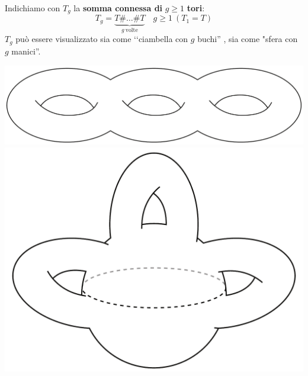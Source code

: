 \begin{define}~{}\\
	Indichiamo con $T_g$ la \textbf{somma connessa di }$g\geq 1$ \textbf{tori}:
	\begin{equation}
		T_g=\underbrace{T\# \ldots\# T}_{g\ \text{volte}}\quad g\geq 1\ \left(T_1=T\right)
	\end{equation}
$T_g$ può essere visualizzato sia come ‘‘ciambella con $g$ buchi'' , sia come "sfera con $g$ manici''.
\begin{center}
	\includegraphics[trim=0cm 0cm 0cm 0cm, clip, scale=0.25]{images/toruschain.pdf}
	\includegraphics[trim=0cm 0cm 0cm 0cm, clip, scale=0.25]{images/spherewithhandle.pdf}
\end{center}
\vspace{-3mm}
\end{define}
